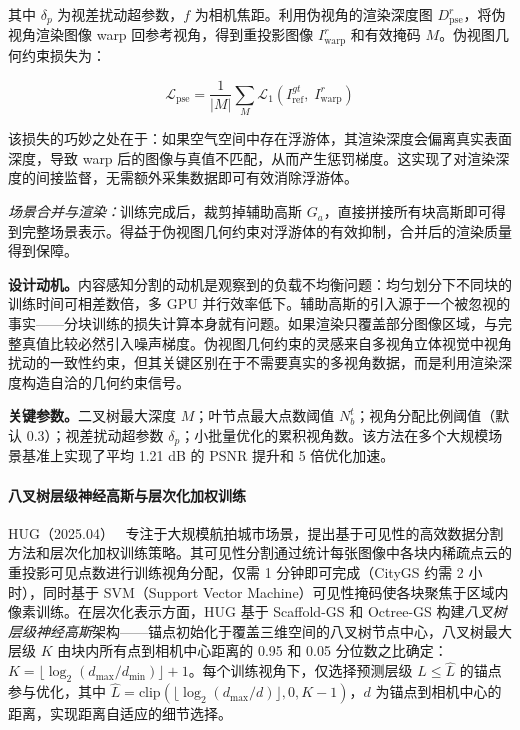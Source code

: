 其中 $\delta_p$ 为视差扰动超参数，$f$ 为相机焦距。利用伪视角的渲染深度图 $D_{\text{pse}}^r$，将伪视角渲染图像 warp 回参考视角，得到重投影图像 $I_{\text{warp}}^r$ 和有效掩码 $M$。伪视图几何约束损失为：

\begin{equation}
\mathcal{L}_{\text{pse}} = \frac{1}{|M|} \sum_{M} \mathcal{L}_1(I_{\text{ref}}^{gt},\; I_{\text{warp}}^r)
\end{equation}

该损失的巧妙之处在于：如果空气空间中存在浮游体，其渲染深度会偏离真实表面深度，导致 warp 后的图像与真值不匹配，从而产生惩罚梯度。这实现了对渲染深度的间接监督，无需额外采集数据即可有效消除浮游体。

\emph{场景合并与渲染：}训练完成后，裁剪掉辅助高斯 $G_a$，直接拼接所有块高斯即可得到完整场景表示。得益于伪视图几何约束对浮游体的有效抑制，合并后的渲染质量得到保障。

\textbf{设计动机。}内容感知分割的动机是观察到的负载不均衡问题：均匀划分下不同块的训练时间可相差数倍，多 GPU 并行效率低下。辅助高斯的引入源于一个被忽视的事实——分块训练的损失计算本身就有问题。如果渲染只覆盖部分图像区域，与完整真值比较必然引入噪声梯度。伪视图几何约束的灵感来自多视角立体视觉中视角扰动的一致性约束，但其关键区别在于不需要真实的多视角数据，而是利用渲染深度构造自洽的几何约束信号。

\textbf{关键参数。}二叉树最大深度 $M$；叶节点最大点数阈值 $N_b^t$；视角分配比例阈值（默认 0.3）；视差扰动超参数 $\delta_p$；小批量优化的累积视角数。该方法在多个大规模场景基准上实现了平均 1.21 dB 的 PSNR 提升和 5 倍优化加速。

\paragraph{八叉树层级神经高斯与层次化加权训练}

HUG（2025.04）~\cite{2504_16606} 专注于大规模航拍城市场景，提出基于可见性的高效数据分割方法和层次化加权训练策略。其可见性分割通过统计每张图像中各块内稀疏点云的重投影可见点数进行训练视角分配，仅需 1 分钟即可完成（CityGS 约需 2 小时），同时基于 SVM（Support Vector Machine）可见性掩码使各块聚焦于区域内像素训练。在层次化表示方面，HUG 基于 Scaffold-GS 和 Octree-GS 构建\emph{八叉树层级神经高斯}架构——锚点初始化于覆盖三维空间的八叉树节点中心，八叉树最大层级 $K$ 由块内所有点到相机中心距离的 0.95 和 0.05 分位数之比确定：$K = \lfloor\log_2(d_{\max}/d_{\min})\rfloor + 1$。每个训练视角下，仅选择预测层级 $L \leq \hat{L}$ 的锚点参与优化，其中 $\hat{L} = \text{clip}(\lfloor\log_2(d_{\max}/d)\rfloor, 0, K-1)$，$d$ 为锚点到相机中心的距离，实现距离自适应的细节选择。

